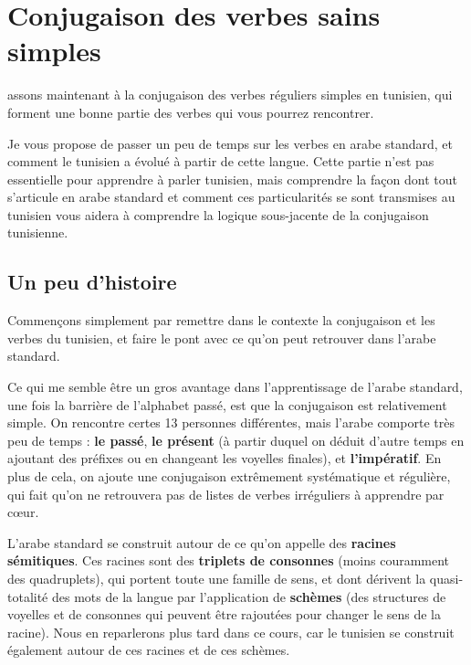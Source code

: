 \chapter{Conjugaison des verbes sains simples}
\label{ConjSS}
assons maintenant à la conjugaison des verbes réguliers simples en tunisien, qui forment une bonne partie des verbes qui vous pourrez rencontrer.

Je vous propose de passer un peu de temps sur les verbes en arabe standard, et comment le tunisien a évolué à partir de cette langue. Cette partie n'est pas essentielle pour apprendre à parler tunisien, mais comprendre la façon dont tout s'articule en arabe standard et comment ces particularités se sont transmises au tunisien vous aidera à comprendre la logique sous-jacente de la conjugaison tunisienne.

\section{Un peu d'histoire} \label{ConjSS1}
Commençons simplement par remettre dans le contexte la conjugaison et les verbes du tunisien, et faire le pont avec ce qu'on peut retrouver dans l'arabe standard.

Ce qui me semble être un gros avantage dans l'apprentissage de l'arabe standard, une fois la barrière de l'alphabet passé, est que la conjugaison est relativement simple. On rencontre certes 13 personnes différentes, mais l'arabe comporte très peu de temps : \textbf{le passé}, \textbf{le présent} (à partir duquel on déduit d'autre temps en ajoutant des préfixes ou en changeant les voyelles finales), et \textbf{l'impératif}. En plus de cela, on ajoute une conjugaison extrêmement systématique et régulière, qui fait qu'on ne retrouvera pas de listes de verbes irréguliers à apprendre par c\oe ur. 

L'arabe standard se construit autour de ce qu'on appelle des \textbf{racines sémitiques}. Ces racines sont des \textbf{triplets de consonnes} (moins couramment des quadruplets), qui portent toute une famille de sens, et dont dérivent la quasi-totalité des mots de la langue par l'application de \textbf{schèmes} (des structures de voyelles et de consonnes qui peuvent être rajoutées pour changer le sens de la racine). Nous en reparlerons plus tard dans ce cours, car le tunisien se construit également autour de ces racines et de ces schèmes.

